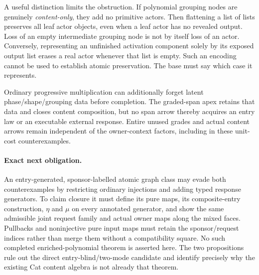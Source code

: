 \documentclass[11pt]{article}
\begin{document}
A useful distinction limits the obstruction. If polynomial grouping nodes are genuinely \emph{content-only}, they add no primitive actors. Then flattening a list of lists preserves all leaf actor objects, even when a leaf actor has no revealed output. Loss of an empty intermediate grouping node is not by itself loss of an actor. Conversely, representing an unfinished activation component solely by its exposed output list erases a real actor whenever that list is empty. Such an encoding cannot be used to establish atomic preservation. The base must say which case it represents.

Ordinary progressive multiplication can additionally forget latent phase/shape/grouping data before completion. The graded-span apex retains that data and closes content composition, but no span arrow thereby acquires an entry law or an executable external response. Entire unused grades and actual content arrows remain independent of the owner-context factors, including in these unit-cost counterexamples.

\paragraph{Exact next obligation.}
An entry-generated, sponsor-labelled atomic graph class may evade both counterexamples by restricting ordinary injections and adding typed response generators. To claim closure it must define its pure maps, its composite-entry construction, $\eta$ and $\mu$ on every annotated generator, and show the same admissible joint request family and actual owner maps along the mixed faces. Pullbacks and noninjective pure input maps must retain the sponsor/request indices rather than merge them without a compatibility square. No such completed enriched-polynomial theorem is asserted here. The two propositions rule out the direct entry-blind/two-mode candidate and identify precisely why the existing Cat content algebra is not already that theorem.
\end{document}
